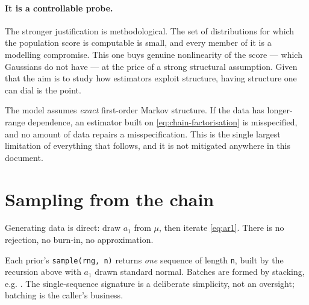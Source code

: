 \paragraph{It is a controllable probe.} The stronger justification is methodological. The set
of distributions for which the population score is computable is small, and every member of it
is a modelling compromise. This one buys genuine nonlinearity of the score --- which
Gaussians do not have --- at the price of a strong structural assumption. Given that the aim
is to study how estimators exploit structure, having structure one can dial is the point.

\begin{pitfall}
The model assumes \emph{exact} first-order Markov structure. If the data has longer-range
dependence, an estimator built on \eqref{eq:chain-factorisation} is misspecified, and no
amount of data repairs a misspecification. This is the single largest limitation of everything
that follows, and it is not mitigated anywhere in this document.
\end{pitfall}

\section{Sampling from the chain}

Generating data is direct: draw $a_1$ from $\mu$, then iterate \eqref{eq:ar1}. There is no
rejection, no burn-in, no approximation.

\begin{codebox}
Each prior's \texttt{sample(rng, n)} returns \emph{one} sequence of length \texttt{n}, built
by the recursion above with $a_1$ drawn standard normal. Batches are formed by stacking, e.g.
. The single-sequence
signature is a deliberate simplicity, not an oversight; batching is the caller's business.
\end{codebox}

